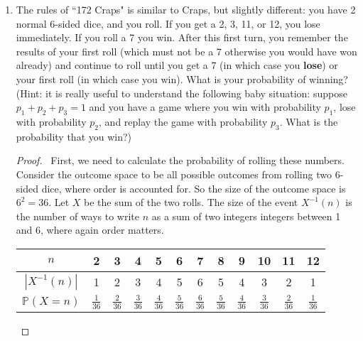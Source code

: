 \documentclass[12pt]{article}
\begin{document}
\begin{enumerate}[leftmargin=0cm,itemindent=.5cm,labelwidth=\itemindent,labelsep=0cm,align=left]
\begin{proof}
To determine $u_n$ for a given $n$, we must identify all possible ways to choose two terms -- one from the left factor, of the form $c^{-s}$; and one from the right factor, of the form $d^{-s}\mu(d)$ -- such that $cd = n$.  $u_n$ will be the sum of all $\mu(d)$ for which such terms exists.  Since both factors contain every divisor of $n$, the expansion contains the term $c^{-s}d^{-s}\mu(b)$, such that $cd = n$, for every divisor $d$ of $n$.  This gives us the following expression for $u_n$: $$u_n = \sum_{d \mid n} \mu(d).$$  Therefore, $$\zeta(s) \sum_{n=1}^\infty \mu (n) n^{-s} = \sum_{n=1}^\infty n^{-s}u_n$$
$$ = \sum_{n=1}^\infty n^{-s}\sum_{d \mid n} \mu(d) = 1^{-s}\sum_{d \mid 1} \mu(d) + \sum_{n=2}^\infty n^{-s}\sum_{d \mid n} \mu(d)$$
$$ = 1 + \sum_{n=2}^\infty n^{-s} \cdot 0 = 1.$$  So $\dfrac{1}{\zeta(s)} = \sum_{n=1}^\infty \mu (n) n^{-s}$.

\end{proof}

\item The rules of ``172 Craps" is similar to Craps, but slightly different: you have 2 normal 6-sided dice, and you roll.  If you get a 2, 3, 11, or 12, you lose immediately.  If you roll a 7 you win.  After this first turn, you remember the results of your first roll (which must not be a 7 otherwise you would have won already) and continue to roll until you get a 7 (in which case you \textbf{lose}) or your first roll (in which case you win).  What is your probability of winning? (Hint: it is really useful to understand the following baby situation: suppose $p_1 + p_2 + p_3 = 1$ and you have a game where you win with probability $p_1$, lose with probability $p_2$, and replay the game with probability $p_3$.  What is the probability that you win?)

\begin{proof}
\ First, we need to calculate the probability of rolling these numbers.  Consider the outcome space to be all possible outcomes from rolling two 6-sided dice, where order is accounted for.   So the size of the outcome space is $6^2 = 36$.  Let $X$ be the sum of the two rolls.  The size of the event $X^{-1}(n)$ is the number of ways to write $n$ as a sum of two integers integers between 1 and 6, where again order matters.

\begin{center}
\renewcommand{\arraystretch}{1.4}
\begin{tabular}{|c|c|c|c|c|c|c|c|c|c|c|c|}
\hline 
$n$ & 2 & 3 & 4 & 5 & 6 & 7 & 8 & 9 & 10 & 11 & 12 \\ 
\hline 
$|X^{-1}(n)|$ & 1 & 2 & 3 & 4 & 5 & 6 & 5 & 4 & 3 & 2 & 1 \\ 
\hline 
$\mathbb{P}(X = n)$ & $\frac{1}{36}$ & $\frac{2}{36}$ & $\frac{3}{36}$ & $\frac{4}{36}$ & $\frac{5}{36}$ & $\frac{6}{36}$ & $\frac{5}{36}$ & $\frac{4}{36}$ & $\frac{3}{36}$ & $\frac{2}{36}$ & $\frac{1}{36}$ \\ 
\hline 
\end{tabular} 


\end{center}
\end{proof}
\end{enumerate}
\end{document}
